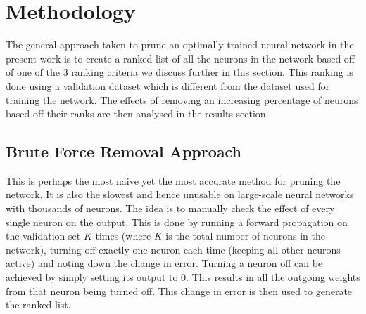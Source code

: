 \section{Methodology}
The general approach taken to prune an optimally trained neural network in the present work is to create a ranked list of all the neurons in the network based off of one of the 3 ranking criteria we discuss further in this section. This ranking is done using a validation dataset which is different from the dataset used for training the network. The effects of removing an increasing percentage of neurons based off their ranks are then analysed in the results section.

\subsection{Brute Force Removal Approach}
This is perhaps the most naive yet the most accurate method for pruning the network. It is also the slowest and hence unusable on large-scale neural networks with thousands of neurons. The idea is to manually check the effect of every single neuron on the output. This is done by running a forward propagation on the validation set $K$ times (where $K$ is the total number of neurons in the network), turning off exactly one neuron each time (keeping all other neurons active) and noting down the change in error. Turning a neuron off can be achieved by simply setting its output to 0. This results in all the outgoing weights from that neuron being turned off. This change in error is then used to generate the ranked list. 




